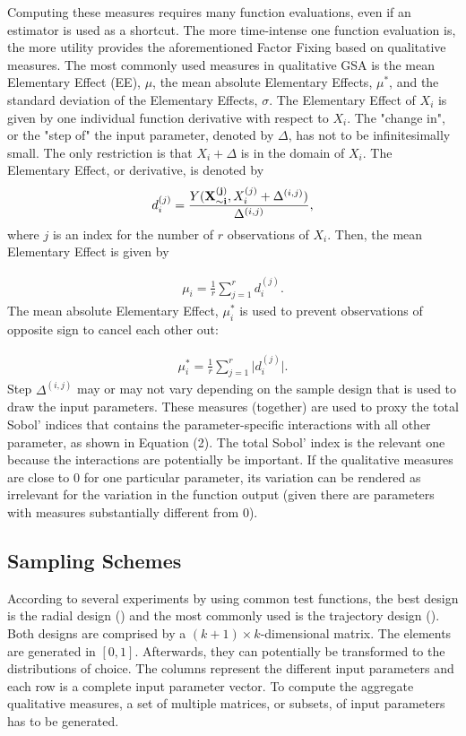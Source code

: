 \documentclass[a4paper,12pt]{article}
\begin{document}
\noindent
Computing these measures requires many function evaluations, even if an estimator is used as a shortcut. The more time-intense one function evaluation is, the more utility provides the aforementioned Factor Fixing based on qualitative measures. The most commonly used measures in qualitative GSA is the mean Elementary Effect (EE), $\mu$, the mean absolute Elementary Effects, $\mu^*$, and the standard deviation of the Elementary Effects, $\sigma$. The Elementary Effect of $X_i$ is given by one individual function derivative with respect to $X_i$. The "change in", or the "step of" the input parameter, denoted by $\Delta$, has not to be infinitesimally small. The only restriction is that $X_i + \Delta$ is in the domain of $X_i$. The Elementary Effect, or derivative, is denoted by
\begin{align}
d_i^{(j)} =  \frac{Y(\bold{X_{\sim i}^{(j)}}, X_i^{(j)} + \Delta^{(i,j)})}{\Delta^{(i,j)}},
\end{align}
where $j$ is an index for the number of $r$ observations of $X_i$.
Then, the mean Elementary Effect is given by

\begin{align}
\mu_i = \frac{1}{r} \sum_{j=1}^{r} d_i^{(j)}.
\end{align}
\noindent
The mean absolute Elementary Effect, $\mu_i^*$ is used to prevent observations of opposite sign to cancel each other out:

\begin{align}
\mu_i^* = \frac{1}{r} \sum_{j=1}^{r} \big| d_i^{(j)} \big|.
\end{align}
\noindent
Step $\Delta^{(i,j)}$ may or may not vary depending on the sample design that is used to draw the input parameters. These measures (together) are used to proxy the total Sobol' indices that contains the parameter-specific interactions with all other parameter, as shown in Equation (2). The total Sobol' index is the relevant one because the interactions are potentially be important. If the qualitative measures are close to 0 for one particular parameter, its variation can be rendered as irrelevant for the variation in the function output (given there are parameters with measures substantially different from 0).

\subsection{Sampling Schemes}

According to several experiments by \cite{campolongo2011screening} using common test functions, the best design is the radial design (\cite{saltelli2002making}) and the most commonly used is the trajectory design (\cite{Morris.1991}).
Both designs are comprised by a $(k + 1) \times k$-dimensional matrix. The elements are generated in $[0,1]$. Afterwards, they can potentially be transformed to the distributions of choice. The columns represent the different input parameters and each row is a complete input parameter vector. To compute the aggregate qualitative measures, a set of multiple matrices, or subsets, of input parameters has to be generated.\\
\end{document}
